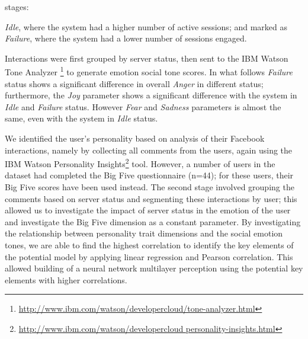 \documentclass[graybox]{svmult}
\begin{document}
stages: {\emph{Idle}, where the system had a higher number of active
sessions; and marked as {\emph{Failure}}, where the system had a lower
number of sessions engaged. 



Interactions were first grouped by server status, then
sent to the IBM Watson Tone Analyzer \footnote{\url{http://www.ibm.com/watson/developercloud/tone-analyzer.html}} to generate emotion social
tone scores. In what follows {\emph{Failure}} status shows a significant difference in
overall {\emph{Anger}} in different status; furthermore, the
{\emph{Joy}} parameter shows a significant difference with the system
in {\emph{Idle}} and {\emph{Failure}} status. However {\emph{Fear}}
and {\emph{Sadness}} parameters is almost the same, even with the
system in {\emph{Idle}} status. 



We identified the user's personality based on analysis of their
Facebook interactions, namely by collecting all comments from the
users, again using the IBM Watson Personality Insights\footnote{\url{http://www.ibm.com/watson/developercloud personality-insights.html}} tool. However,
a number of users in the dataset had completed the Big Five
questionnaire (n=44); for these users, their Big Five scores have
been used instead. The second stage involved grouping the comments
based on server status and segmenting these interactions by user; this
allowed us to investigate the impact of server status in the emotion
of the user and investigate the Big Five dimension as a constant
parameter. By investigating the relationship between personality trait
dimensions and the social emotion tones, we are able to find the
highest correlation to identify the key elements of the potential
model by applying linear regression and Pearson correlation. This
allowed building of a neural network multilayer perception using the
potential key elements with higher correlations.

}
\end{document}
